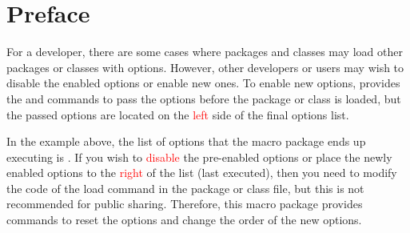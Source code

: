 \documentclass[load-preamble+]{cnltx-doc}
\begin{document}
\section{Preface}
For a developer, there are some cases where packages and classes may load other packages or classes with options. However, other developers or users may wish to disable the enabled options or enable new ones. To enable new options,  provides the  and  commands to pass the options before the package or class is loaded, but the passed options are located on the \textcolor{red}{left} side of the final options list.

In the example above, the list of options that the  macro package ends up executing is . If you wish to \textcolor{red}{disable} the pre-enabled options or place the newly enabled options to the \textcolor{red}{right} of the list (last executed), then you need to modify the code of the load command in the package or class file, but this is not recommended for public sharing. Therefore, this macro package provides commands to reset the options and change the order of the new options.
\end{document}
